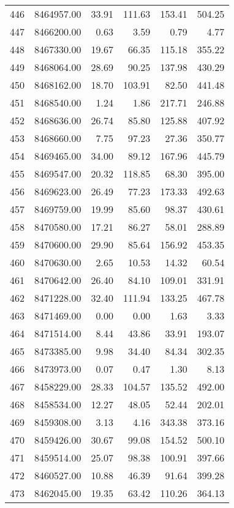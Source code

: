 \begin{table}[ht]
\begin{tabular}{rrrrrr}
  446 & 8464957.00 & 33.91 & 111.63 & 153.41 & 504.25 \\ 
  447 & 8466200.00 & 0.63 & 3.59 & 0.79 & 4.77 \\ 
  448 & 8467330.00 & 19.67 & 66.35 & 115.18 & 355.22 \\ 
  449 & 8468064.00 & 28.69 & 90.25 & 137.98 & 430.29 \\ 
  450 & 8468162.00 & 18.70 & 103.91 & 82.50 & 441.48 \\ 
  451 & 8468540.00 & 1.24 & 1.86 & 217.71 & 246.88 \\ 
  452 & 8468636.00 & 26.74 & 85.80 & 125.88 & 407.92 \\ 
  453 & 8468660.00 & 7.75 & 97.23 & 27.36 & 350.77 \\ 
  454 & 8469465.00 & 34.00 & 89.12 & 167.96 & 445.79 \\ 
  455 & 8469547.00 & 20.32 & 118.85 & 68.30 & 395.00 \\ 
  456 & 8469623.00 & 26.49 & 77.23 & 173.33 & 492.63 \\ 
  457 & 8469759.00 & 19.99 & 85.60 & 98.37 & 430.61 \\ 
  458 & 8470580.00 & 17.21 & 86.27 & 58.01 & 288.89 \\ 
  459 & 8470600.00 & 29.90 & 85.64 & 156.92 & 453.35 \\ 
  460 & 8470630.00 & 2.65 & 10.53 & 14.32 & 60.54 \\ 
  461 & 8470642.00 & 26.40 & 84.10 & 109.01 & 331.91 \\ 
  462 & 8471228.00 & 32.40 & 111.94 & 133.25 & 467.78 \\ 
  463 & 8471469.00 & 0.00 & 0.00 & 1.63 & 3.33 \\ 
  464 & 8471514.00 & 8.44 & 43.86 & 33.91 & 193.07 \\ 
  465 & 8473385.00 & 9.98 & 34.40 & 84.34 & 302.35 \\ 
  466 & 8473973.00 & 0.07 & 0.47 & 1.30 & 8.13 \\ 
  467 & 8458229.00 & 28.33 & 104.57 & 135.52 & 492.00 \\ 
  468 & 8458534.00 & 12.27 & 48.05 & 52.44 & 202.01 \\ 
  469 & 8459308.00 & 3.13 & 4.16 & 343.38 & 373.16 \\ 
  470 & 8459426.00 & 30.67 & 99.08 & 154.52 & 500.10 \\ 
  471 & 8459514.00 & 25.07 & 98.38 & 100.91 & 397.66 \\ 
  472 & 8460527.00 & 10.88 & 46.39 & 91.64 & 399.28 \\ 
  473 & 8462045.00 & 19.35 & 63.42 & 110.26 & 364.13 \\ 

\end{tabular}
\end{table}
